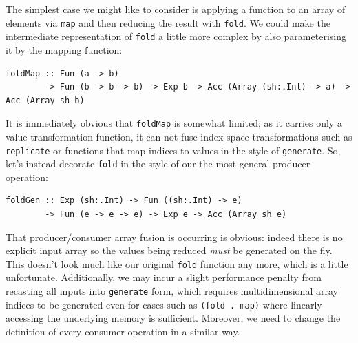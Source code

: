 The simplest case we might like to consider is applying a function to an array
of elements via \texttt{map} and then reducing the result with \texttt{fold}. We
could make the intermediate representation of \texttt{fold} a little more
complex by also parameterising it by the mapping function:
%
\begin{lstlisting}[style=haskell,numbers=none]
foldMap :: Fun (a -> b)
        -> Fun (b -> b -> b) -> Exp b -> Acc (Array (sh:.Int) -> a) -> Acc (Array sh b)
\end{lstlisting}

It is immediately obvious that \texttt{foldMap} is somewhat limited; as it
carries only a value transformation function, it can not fuse index space
transformations such as \texttt{replicate} or functions that map indices to
values in the style of \texttt{generate}. So, let's instead decorate
\texttt{fold} in the style of our the most general producer operation:
%
\begin{lstlisting}[style=haskell,numbers=none]
foldGen :: Exp (sh:.Int) -> Fun ((sh:.Int) -> e)
        -> Fun (e -> e -> e) -> Exp e -> Acc (Array sh e)
\end{lstlisting}
%
That producer/consumer array fusion is occurring is obvious: indeed there is no
explicit input array so the values being reduced \emph{must} be generated on the
fly. This doesn't look much like our original \texttt{fold} function any more,
which is a little unfortunate. Additionally, we may incur a slight performance
penalty from recasting all inputs into \texttt{generate} form, which requires
multidimensional array indices to be generated even for cases such as
\lstinline[style=inline]{(fold . map)} where linearly accessing the underlying
memory is sufficient. Moreover, we need to change the definition of every
consumer operation in a similar way.

